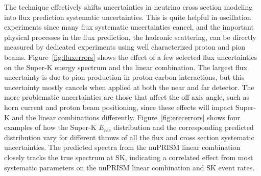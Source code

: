 The \nuprism technique effectively shifts uncertainties in neutrino cross section modeling into flux prediction systematic uncertainties. This is quite helpful in oscillation experiments since many flux systematic uncertainties cancel, and the important physical processes in the flux prediction, the hadronic scattering, can be directly measured by dedicated experiments using well characterized proton and pion beams. Figure~\ref{fig:fluxerrors} shows the effect of a few selected flux uncertainties on the Super-K energy spectrum and the \nuprismlite linear combination. The largest flux uncertainty is due to pion production in proton-carbon interactions, but this uncertainty mostly cancels when applied at both the near and far detector. The more problematic uncertainties are those that affect the off-axis angle, such as horn current and proton beam positioning, since these effects will impact Super-K and the \nuprismlite linear combinations differently. Figure~\ref{fig:erecerrors} shows four examples of how the Super-K $E_{rec}$ distribution and the corresponding \nuprismlite predicted distribution vary for different throws of all the flux and cross section systematic uncertainties. The predicted spectra from the nuPRISM linear combination closely tracks the true spectrum at SK, indicating a correlated effect from most systematic parameters on the nuPRISM linear combination and SK event rates.

